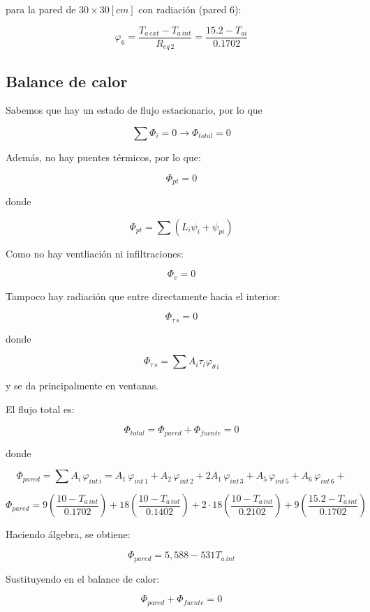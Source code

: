 \documentclass[12pt]{article}
\begin{document}
para la pared de $ 30 \times 30 \left[ cm \right] $ con radiación (pared 6):

\[ \varphi _6 = \frac{ T_{ a \, ext } - T_{ a \, int } }{ R_{ eq \, 2 } } = \frac{ 15.2 - T_{ ai } }{ 0.1702 } \]

\subsection{Balance de calor}

Sabemos que hay un estado de flujo estacionario, por lo que

\[  \sum{ \Phi _i } = 0 \longrightarrow \Phi _{ total } = 0 \]

Además, no hay puentes térmicos, por lo que:

\[ \Phi _{ pt } = 0 \]

donde

\[ \Phi _{ pt } = \sum{ \left( L_i \psi _i + \psi _{ pi } \right) }  \]

Como no hay ventliación ni infiltraciones:

\[ \Phi _v = 0 \]

Tampoco hay radiación que entre directamente hacia el interior:

\[ \Phi _{ \tau \, s } = 0 \]

donde

\[ \Phi _{ \tau \, s } = \sum{ A_i \tau _i \varphi _{ \theta \, i } } \]

y se da principalmente en ventanas.

El flujo total es:

\[ \Phi _{ total } = \Phi _{ pared } + \Phi _{ fuente } = 0 \]

donde

\[ \Phi _{ pared } = \sum{ A_i \, \varphi _{ int \, i } } = A_1 \, \varphi _{ int \, 1 } + A_2 \, \varphi _{ int \, 2 } + 2 A_1 \, \varphi _{ int \, 3 } + A_5 \, \varphi _{ int \, 5 } + A_6 \, \varphi _{ int \, 6 } + \]

\[ \Phi _{ pared } = 9 \left( \frac{ 10 - T_{ a \, int } }{ 0.1702 } \right) + 18 \left( \frac{ 10 - T_{ a \, int } }{ 0.1402 } \right) + 2 \cdot 18 \left( \frac{ 10 - T_{ a \, int } }{ 0.2102 } \right) + 9 \left( \frac{ 15.2 - T_{ a \, int } }{ 0.1702 } \right) \]

Haciendo álgebra, se obtiene:

\[ \Phi _{ pared } = 5,588 - 531 T_{ a \, int } \]

Sustituyendo en el balance de calor:

\[ \Phi _{ pared } + \Phi _{ fuente } = 0 \]
\end{document}
